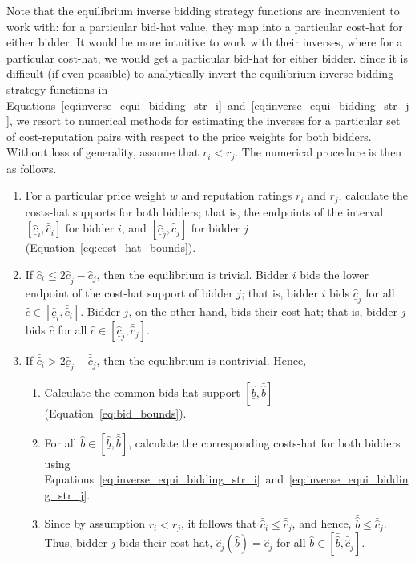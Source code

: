 Note that the equilibrium inverse bidding strategy functions are inconvenient to work with: for a particular bid-hat value, they map into a particular cost-hat for either bidder. It would be more intuitive to work with their inverses, where for a particular cost-hat, we would get a particular bid-hat for either bidder. Since it is difficult (if even possible) to analytically invert the equilibrium inverse bidding strategy functions in Equations~\eqref{eq:inverse_equi_bidding_str_i}~and~\eqref{eq:inverse_equi_bidding_str_j}, we resort to numerical methods for estimating the inverses for a particular set of cost-reputation pairs with respect to the price weights for both bidders. Without loss of generality, assume that $r_i < r_j$. The numerical procedure is then as follows.
\begin{enumerate}
  \item For a particular price weight $w$ and reputation ratings $r_i$ and $r_j$, calculate the costs-hat supports for both bidders; that is, the endpoints of the interval $[\underline{\hat{c}}_i, \bar{\hat{c}}_i]$ for bidder $i$, and $[\underline{\hat{c}}_j, \bar{\hat{c}}_j]$ for bidder $j$ (Equation~\eqref{eq:cost_hat_bounds}).
  \item If $\bar{\hat{c}}_i \le 2\underline{\hat{c}}_j - \bar{\hat{c}}_j$, then the equilibrium is trivial. Bidder $i$ bids the lower endpoint of the cost-hat support of bidder $j$; that is, bidder $i$ bids $\underline{\hat{c}}_j$ for all $\hat{c}\in [\underline{\hat{c}}_i, \bar{\hat{c}}_i]$. Bidder $j$, on the other hand, bids their cost-hat; that is, bidder $j$ bids $\hat{c}$ for all $\hat{c}\in [\underline{\hat{c}}_j, \bar{\hat{c}}_j]$.
  \item If $\bar{\hat{c}}_i > 2\underline{\hat{c}}_j - \bar{\hat{c}}_j$, then the equilibrium is nontrivial. Hence,
  \begin{enumerate}
    \item Calculate the common bids-hat support $[\underline{\hat{b}}, \bar{\hat{b}}]$ (Equation~\eqref{eq:bid_bounds}).
    \item For all $\hat{b}\in [\underline{\hat{b}}, \bar{\hat{b}}]$, calculate the corresponding costs-hat for both bidders using Equations~\eqref{eq:inverse_equi_bidding_str_i}~and~\eqref{eq:inverse_equi_bidding_str_j}.
    \item Since by assumption $r_i < r_j$, it follows that $\bar{\hat{c}}_i \le \bar{\hat{c}}_j$, and hence, $\bar{\hat{b}}\le \bar{\hat{c}}_j$. Thus, bidder $j$ bids their cost-hat, $\hat{c}_j(\hat{b}) = \hat{c}_j$  for all $\hat{b}\in [\bar{\hat{b}}, \bar{\hat{c}}_j]$.
  \end{enumerate}
\end{enumerate}

